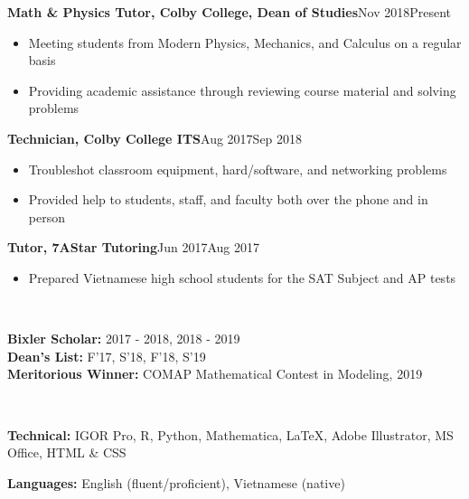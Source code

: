 \documentclass[letter, 9pt]{article}
\newcommand{\longunderline}[1]{\uline{#1\hfill\mbox{}}}
\begin{document}
	  \textbf{Math \& Physics Tutor, Colby College, Dean of Studies}\hfill Nov 2018\textemdash Present
	\begin{itemize}[noitemsep, nolistsep]
		\item Meeting students from Modern Physics, Mechanics, and Calculus on a regular basis
		\item Providing academic assistance through reviewing course material and solving problems
	\end{itemize}
	   \textbf{Technician, Colby College ITS}\hfill Aug 2017\textemdash Sep 2018
	\begin{itemize}[noitemsep, nolistsep]
		\item Troubleshot classroom equipment, hard/software, and networking problems
		\item Provided help to students, staff, and faculty both over the phone and in person
	\end{itemize}
	  \textbf{Tutor, 7AStar Tutoring}\hfill Jun 2017\textemdash Aug 2017
	\begin{itemize}[noitemsep, nolistsep]
		\item Prepared Vietnamese high school students for the SAT Subject and AP tests\\
	\end{itemize}

	\vspace{-7pt} \noindent \longunderline{\normalsize{{\color{colby}{\textbf{HONORS \& AWARDS}}}}}\\ \vspace{-7pt}
			
		\noindent \textbf{Bixler Scholar:} 2017 - 2018, 2018 - 2019\\
		\noindent \textbf{Dean's List:} F'17, S'18, F'18, S'19\\
		\noindent \textbf{Meritorious Winner:} {COMAP} Mathematical Contest in Modeling, 2019\\ \vspace{-7pt}
	
	
	\noindent \longunderline{\normalsize{{}}}
	\\ \vspace{-7pt}
	
	\noindent \textbf{Technical:} IGOR Pro, R, Python, Mathematica, \LaTeX{}, Adobe Illustrator, MS Office,  HTML \& CSS
	
	\noindent \textbf{Languages:} English (fluent/proficient), Vietnamese (native)\\
	\vspace{-7pt}
	
\end{document}
